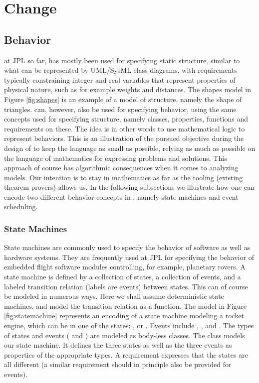\section{Change}
\label{sec:change}

\subsection{Behavior}

\Klang{} at JPL so far, has mostly been used for specifying static 
structure, similar to what can be represented by UML/SysML class diagrams, with 
requirements typically constraining integer and real variables that represent 
properties of physical nature, such as for example weights and distances.
The shapes model in Figure \ref{fig:shapes} is an example of a model of structure, namely the shape of triangles.
\Klang{} can, however, also be used for specifying behavior, using the same
concepts used for specifying structure, namely classes, properties, functions and
requirements on these. The idea is in other words to use mathematical logic to 
represent behaviors. This is an illustration of the pursued objective during 
the design of \Klang{} to keep the language as small as possible, relying as much 
as possible on the language of mathematics for expressing problems and solutions. 
This approach of course has algorithmic consequences when it comes to analyzing 
models. Our intention is to stay in mathematics as far as the tooling (existing 
theorem provers) allows us. In the following subsections we illustrate how one can 
encode two different behavior concepts in \Klang{}, namely state machines and event 
scheduling.

\subsubsection{State Machines}

State machines are commonly used to specify the behavior of software
as well as hardware systems. They are frequently used at JPL for
specifying the behavior of embedded flight software modules
controlling, for example, planetary rovers. A state machine is defined
by a collection of states, a collection of events, and a labeled
transition relation (labels are events) between states. This can of
course be modeled in numerous ways. Here we shall assume deterministic
state machines, and model the transition relation as a function.  The
\Klang{} model in Figure \ref{fig:statemachine} represents an encoding
of a state machine modeling a rocket engine, which can be in one of
the states: ,  or . Events include
, , and . The types of
states and events ( and ) are modeled as
body-less classes. The class  models our state
machine. It defines the three states as well as the three events as
properties of the appropriate types. A requirement expresses that the
states are all different (a similar requirement should in principle
also be provided for events).

